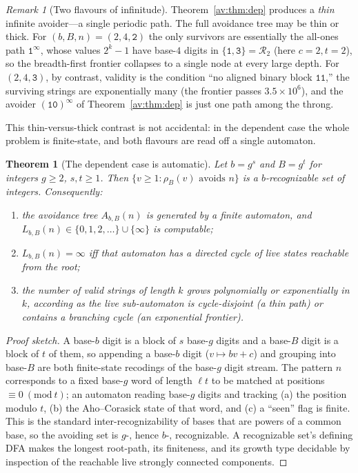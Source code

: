 \documentclass[a4paper]{article}
\theoremstyle{plain}
\newtheorem{theorem}{Theorem}[subsection]
\theoremstyle{definition}
\theoremstyle{remark}
\newtheorem{remark}{Remark}[subsection]
\newcommand{\Lbb}[1][b,B]{L_{#1}}
\begin{document}
\begin{remark}[Two flavours of infinitude]
Theorem~\ref{av:thm:dep} produces a \emph{thin} infinite avoider---a single periodic path. The full avoidance tree may be thin or thick. For $(b,B,n)=(2,4,\texttt{2})$ the only survivors are essentially the all-ones path $\texttt{1}^{\infty}$, whose values $2^{k}-1$ have base-$4$ digits in $\{\texttt{1},\texttt{3}\}=\mathcal R_2$ (here $c=2,t=2$), so the breadth-first frontier collapses to a single node at every large depth. For $(2,4,\texttt{3})$, by contrast, validity is the condition ``no aligned binary block $\texttt{11}$,'' the surviving strings are exponentially many (the frontier passes $3.5\times10^{6}$), and the avoider $(\texttt{10})^{\infty}$ of Theorem~\ref{av:thm:dep} is just one path among the throng.
\end{remark}

This thin-versus-thick contrast is not accidental: in the dependent case the whole problem is finite-state, and both flavours are read off a single automaton.

\begin{theorem}[The dependent case is automatic]\label{av:thm:auto}
Let $b=g^{s}$ and $B=g^{t}$ for integers $g\ge2$, $s,t\ge1$. Then $\{v\ge1:\rho_B(v)\text{ avoids }n\}$ is a $b$-recognizable set of integers. Consequently:
\begin{enumerate}\itemsep1pt
\item[(i)] the avoidance tree $A_{b,B}(n)$ is generated by a finite automaton, and $\Lbb(n)\in\{0,1,2,\dots\}\cup\{\infty\}$ is \emph{computable};
\item[(ii)] $\Lbb(n)=\infty$ iff that automaton has a directed cycle of live states reachable from the root;
\item[(iii)] the number of valid strings of length $k$ grows polynomially or exponentially in $k$, according as the live sub-automaton is cycle-disjoint (a thin path) or contains a branching cycle (an exponential frontier).
\end{enumerate}
\end{theorem}

\begin{proof}[Proof sketch]
A base-$b$ digit is a block of $s$ base-$g$ digits and a base-$B$ digit is a block of $t$ of them, so appending a base-$b$ digit ($v\mapsto bv+c$) and grouping into base-$B$ are both finite-state recodings of the base-$g$ digit stream. The pattern $n$ corresponds to a fixed base-$g$ word of length $\ell t$ to be matched at positions $\equiv0\ (\mathrm{mod}\ t)$; an automaton reading base-$g$ digits and tracking (a) the position modulo $t$, (b) the Aho--Corasick state of that word, and (c) a ``seen'' flag is finite. This is the standard inter-recognizability of bases that are powers of a common base, so the avoiding set is $g$-, hence $b$-, recognizable. A recognizable set's defining DFA makes the longest root-path, its finiteness, and its growth type decidable by inspection of the reachable live strongly connected components.
\end{proof}
\end{document}
